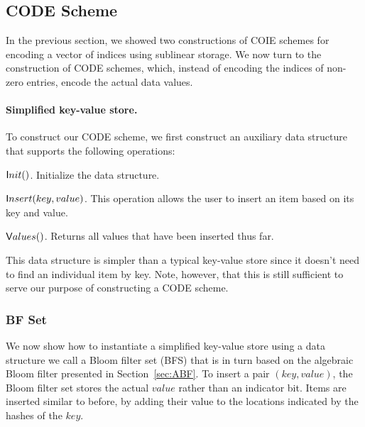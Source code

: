 \subsection{CODE Scheme}
In the previous section, we showed two constructions of COIE schemes for encoding a vector of indices using sublinear storage.  We now turn to the construction of CODE schemes, which, instead of encoding the indices of non-zero entries, encode the actual data values.




\paragraph{Simplified key-value store.}
To construct our CODE scheme, we first construct an auxiliary data structure that supports the
following operations: 

\BI
\item ${\sf Init}()$. Initialize the data structure.  

\item ${\sf Insert}(key, value)$. This operation allows the user to
insert an item based on its key and value.  

\item ${\sf Values}()$. Returns all  values that have been
inserted thus far. 
\EI

This data structure is simpler than a typical key-value store since it
doesn't need to find an individual item by key. Note, however, that this
is still sufficient to serve our purpose of constructing a CODE scheme. 

\subsubsection{BF Set}\label{ssec:countingBloom}
We now show how to instantiate a simplified key-value store using a data structure we
call a Bloom filter set ({\sf BFS}) that is in turn based on the algebraic Bloom filter
presented in Section~\ref{sec:ABF}.
To insert a pair  $(key, value)$, the Bloom
filter set stores the actual $value$ rather than an indicator bit.  Items are
inserted similar to before, by adding their value to the locations
indicated by the hashes of the $key$.



